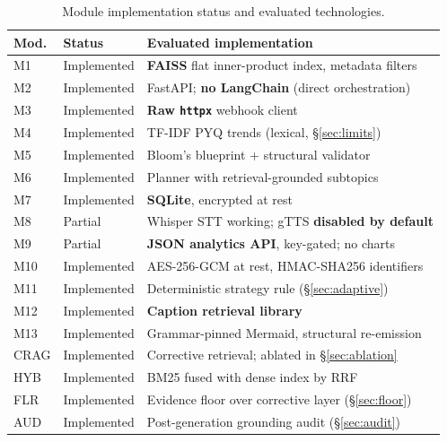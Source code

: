 \documentclass[conference]{IEEEtran}
\begin{document}
\begin{table}[htbp]
\caption{Module implementation status and evaluated technologies.}
\label{tab:status}
\centering
\scriptsize
\setlength{\tabcolsep}{3pt}
\begin{tabular}{@{}p{0.65cm} p{1.15cm} p{5.75cm}@{}}
\toprule
\textbf{Mod.} & \textbf{Status} & \textbf{Evaluated implementation} \\
\midrule
M1 & Implemented & \textbf{FAISS} flat inner-product index, metadata filters \\
M2 & Implemented & FastAPI; \textbf{no LangChain} (direct orchestration) \\
M3 & Implemented & \textbf{Raw \texttt{httpx}} webhook client \\
M4 & Implemented & TF-IDF PYQ trends (lexical, §\ref{sec:limits}) \\
M5 & Implemented & Bloom's blueprint + structural validator \\
M6 & Implemented & Planner with retrieval-grounded subtopics \\
M7 & Implemented & \textbf{SQLite}, encrypted at rest \\
M8 & Partial & Whisper STT working; gTTS \textbf{disabled by default} \\
M9 & Partial & \textbf{JSON analytics API}, key-gated; no charts \\
M10 & Implemented & AES-256-GCM at rest, HMAC-SHA256 identifiers \\
M11 & Implemented & Deterministic strategy rule (§\ref{sec:adaptive}) \\
M12 & Implemented & \textbf{Caption retrieval library} \\
M13 & Implemented & Grammar-pinned Mermaid, structural re-emission \\
CRAG & Implemented & Corrective retrieval; ablated in §\ref{sec:ablation} \\
HYB & Implemented & BM25 fused with dense index by RRF \\
FLR & Implemented & Evidence floor over corrective layer (§\ref{sec:floor}) \\
AUD & Implemented & Post-generation grounding audit (§\ref{sec:audit}) \\
\bottomrule
\end{tabular}
\end{table}
\end{document}
